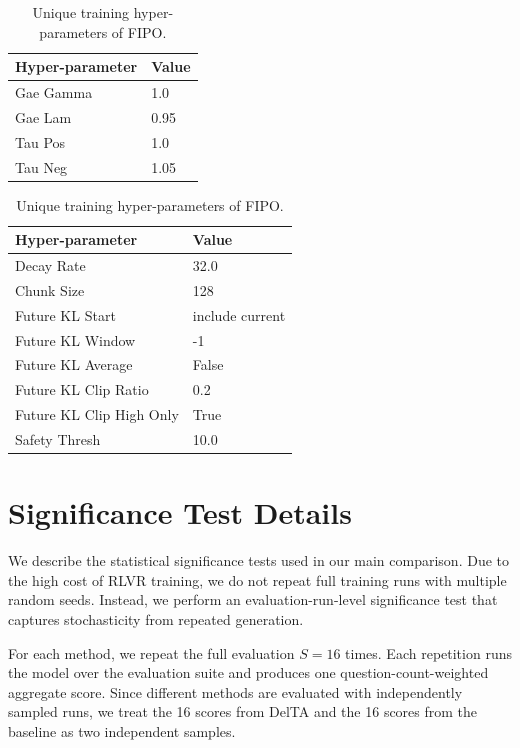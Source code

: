 \documentclass{article} %
\begin{document}
\begin{table}[t]  
\begin{center}
\begin{minipage}[t]{0.48\linewidth}
\caption{Unique training hyper-parameters of SAPO.}
\label{tab: SAPO hyper-parameters}
\centering
\begin{tabular}{ll}
\toprule
Hyper-parameter & Value \\
\midrule
Gae Gamma & 1.0 \\
Gae Lam & 0.95 \\
Tau Pos & 1.0 \\
Tau Neg & 1.05 \\
\bottomrule
\end{tabular}
\end{minipage}  
\hfil
\begin{minipage}[t]{0.48\linewidth}
\caption{Unique training hyper-parameters of FIPO.}
\label{tab: FIPO hyper-parameters}
\centering
\begin{tabular}{ll}
\toprule
Hyper-parameter & Value \\
\midrule
Decay Rate & 32.0  \\
Chunk Size & 128 \\
Future KL Start & include current \\
Future KL Window & -1 \\
Future KL Average & False \\
Future KL Clip Ratio & 0.2 \\
Future KL Clip High Only & True \\
Safety Thresh & 10.0 \\
\bottomrule
\end{tabular}
\end{minipage} 
\end{center}
\end{table}

\section{Significance Test Details}
\label{app:sig}

We describe the statistical significance tests used in our main comparison.
Due to the high cost of RLVR training, we do not repeat full training runs with multiple random seeds.
Instead, we perform an evaluation-run-level significance test that captures stochasticity from repeated generation.


For each method, we repeat the full evaluation \(S=16\) times.
Each repetition runs the model over the evaluation suite and produces one question-count-weighted aggregate score.
Since different methods are evaluated with independently sampled runs, we treat the 16 scores from DelTA and the 16 scores from the baseline as two independent samples.
\end{document}
